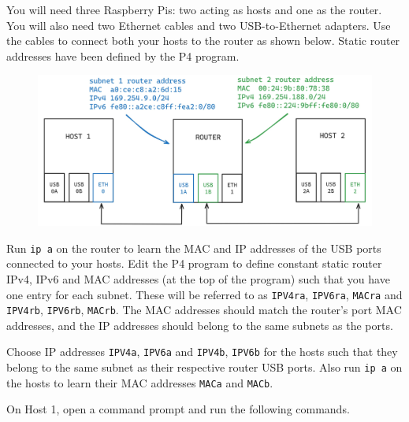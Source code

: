 



You will need three Raspberry Pis: two acting as hosts and one as the router. You will also need two Ethernet cables and two USB-to-Ethernet adapters. Use the cables to connect both your hosts to the router as shown below. Static router addresses have been defined by the P4 program.

\begin{figure}[htbp]
  \centering
    \includegraphics[width=1\textwidth]{figures/appendices/dualstack_setup.jpg}
\end{figure}

Run \texttt{ip a} on the router to learn the MAC and IP addresses of the USB ports connected to your hosts. Edit the P4 program to define constant static router IPv4, IPv6 and MAC addresses (at the top of the program) such that you have one entry for each subnet. These will be referred to as \texttt{IPV4ra}, \texttt{IPV6ra}, \texttt{MACra} and \texttt{IPV4rb}, \texttt{IPV6rb}, \texttt{MACrb}. The MAC addresses should match the router’s port MAC addresses, and the IP addresses should belong to the same subnets as the ports. 

Choose IP addresses \texttt{IPV4a}, \texttt{IPV6a} and \texttt{IPV4b}, \texttt{IPV6b} for the hosts such that they belong to the same subnet as their respective router USB ports. Also run \texttt{ip a} on the hosts to learn their MAC addresses \texttt{MACa} and \texttt{MACb}.

On Host 1, open a command prompt and run the following commands.


